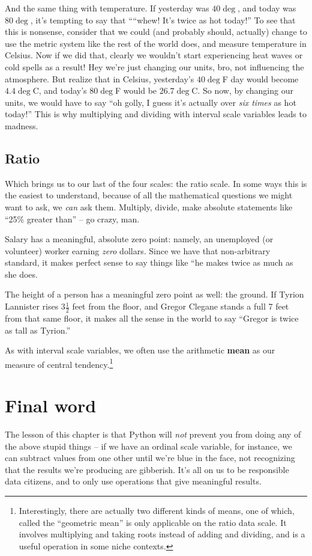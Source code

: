 And the same thing with temperature. If yesterday was $40\deg$, and today was
$80\deg$, it's tempting to say that ````whew! It's twice as hot today!'' To see
that this is nonsense, consider that we could (and probably should, actually)
change to use the metric system like the rest of the world does, and measure
temperature in Celsius. Now if we did that, clearly we wouldn't start
experiencing heat waves or cold spells as a result! Hey we're just changing our
units, bro, not influencing the atmosphere. But realize that in Celsius,
yesterday's $40\deg$F day would become $4.4\deg$C, and today's $80\deg$F would
be $26.7\deg$C. So now, by changing our units, we would have to say ``oh golly,
I guess it's actually over \textit{six times} as hot today!'' This is why
multiplying and dividing with interval scale variables leads to madness.


\subsection{Ratio}

Which brings us to our last of the four scales: the ratio scale. In some ways
this is the easiest to understand, because of all the mathematical questions
we might want to ask, we \textit{can} ask them. Multiply, divide, make 
absolute statements like ``25\% greater than'' -- go crazy, man.

Salary has a meaningful, absolute zero point: namely, an unemployed (or
volunteer) worker earning \textit{zero} dollars. Since we have that
non-arbitrary standard, it makes perfect sense to say things like ``he makes
twice as much as she does.

The height of a person has a meaningful zero point as well: the ground. If
Tyrion Lannister rises $3\frac{1}{2}$ feet from the floor, and Gregor Clegane
stands a full 7 feet from that same floor, it makes all the sense in the world
to say ``Gregor is twice as tall as Tyrion.''

As with interval scale variables, we often use the arithmetic \textbf{mean}  as
our measure of central tendency.\footnote{Interestingly, there are actually two
different kinds of means, one of which, called the ``geometric mean'' is only
applicable on the ratio data scale. It involves multiplying and taking roots
instead of adding and dividing, and is a useful operation in some niche
contexts.}

\section{Final word}
The lesson of this chapter is that Python will \textit{not} prevent you from
doing any of the above stupid things -- if we have an ordinal scale variable,
for instance, we can subtract values from one other until we're blue in the
face, not recognizing that the results we're producing are gibberish. It's all
on us to be responsible data citizens, and to only use operations that give
meaningful results.

